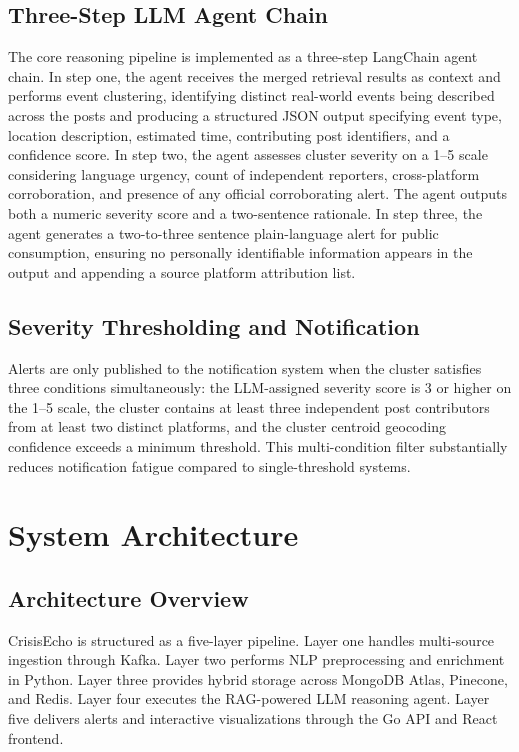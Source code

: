 \documentclass[conference]{IEEEtran}
\begin{document}
\subsection{Three-Step LLM Agent Chain}

The core reasoning pipeline is implemented as a three-step LangChain agent
chain. In step one, the agent receives the merged retrieval results as context
and performs event clustering, identifying distinct real-world events being
described across the posts and producing a structured JSON output specifying
event type, location description, estimated time, contributing post identifiers,
and a confidence score. In step two, the agent assesses cluster severity on a
1--5 scale considering language urgency, count of independent reporters,
cross-platform corroboration, and presence of any official corroborating alert.
The agent outputs both a numeric severity score and a two-sentence rationale.
In step three, the agent generates a two-to-three sentence plain-language alert
for public consumption, ensuring no personally identifiable information appears
in the output and appending a source platform attribution list.

\subsection{Severity Thresholding and Notification}

Alerts are only published to the notification system when the cluster satisfies
three conditions simultaneously: the LLM-assigned severity score is 3 or higher
on the 1--5 scale, the cluster contains at least three independent post
contributors from at least two distinct platforms, and the cluster centroid
geocoding confidence exceeds a minimum threshold. This multi-condition filter
substantially reduces notification fatigue compared to single-threshold systems.

\section{System Architecture}

\subsection{Architecture Overview}

CrisisEcho is structured as a five-layer pipeline. Layer one handles
multi-source ingestion through Kafka. Layer two performs NLP preprocessing
and enrichment in Python. Layer three provides hybrid storage across MongoDB
Atlas, Pinecone, and Redis. Layer four executes the RAG-powered LLM reasoning
agent. Layer five delivers alerts and interactive visualizations through the
Go API and React frontend.
\end{document}
